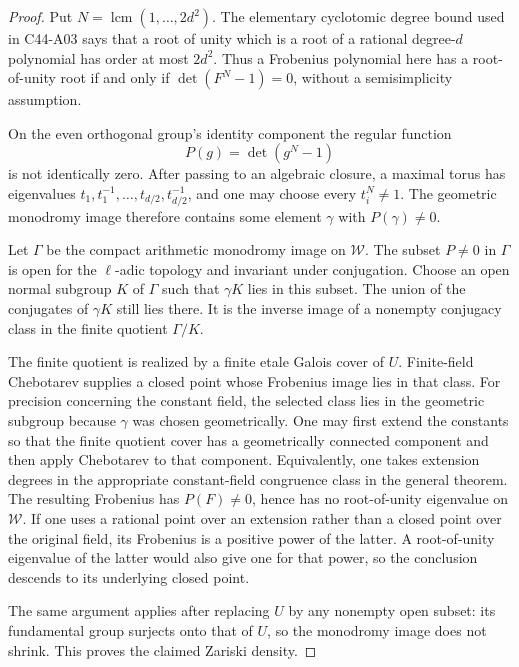 \documentclass[11pt]{article}
\theoremstyle{remark}\newtheorem{remark}[theorem]{Remark}
\begin{document}
\begin{proof}
Put \(N=\operatorname{lcm}(1,\ldots,2d^2)\).
The elementary cyclotomic degree bound used in C44-A03 says that a
root of unity which is a root of a rational degree-\(d\) polynomial
has order at most \(2d^2\). Thus a Frobenius polynomial here has a
root-of-unity root if and only if
\(\det(F^N-1)=0\), without a semisimplicity assumption.

On the even orthogonal group's identity component the regular function
\[
                     P(g)=\det(g^N-1)
\]
is not identically zero. After passing to an algebraic closure,
a maximal torus has eigenvalues
\(t_1,t_1^{-1},\ldots,t_{d/2},t_{d/2}^{-1}\), and one may choose
every \(t_i^N\ne1\).
The geometric monodromy image therefore contains some element
\(\gamma\) with \(P(\gamma)\ne0\).

Let \(\Gamma\) be the compact arithmetic monodromy image on
\(\mathcal W\). The subset \(P\ne0\) in \(\Gamma\) is open for
the \(\ell\)-adic topology and invariant under conjugation.
Choose an open normal subgroup \(K\) of \(\Gamma\) such that
\(\gamma K\) lies in this subset. The union of the conjugates of
\(\gamma K\) still lies there. It is the inverse image of a
nonempty conjugacy class in the finite quotient \(\Gamma/K\).

The finite quotient is realized by a finite etale Galois cover of
\(U\). Finite-field Chebotarev supplies a closed point whose
Frobenius image lies in that class. For precision concerning the
constant field, the selected class lies in the geometric subgroup
because \(\gamma\) was chosen geometrically. One may first extend
the constants so that the finite quotient cover has a geometrically
connected component and then apply Chebotarev to that component.
Equivalently, one takes extension degrees in the appropriate
constant-field congruence class in the general theorem.
The resulting Frobenius has \(P(F)\ne0\), hence has no
root-of-unity eigenvalue on \(\mathcal W\).
If one uses a rational point over an extension rather than a closed
point over the original field, its Frobenius is a positive power of
the latter. A root-of-unity eigenvalue of the latter would also
give one for that power, so the conclusion descends to its
underlying closed point.

The same argument applies after replacing \(U\) by any nonempty
open subset: its fundamental group surjects onto that of \(U\),
so the monodromy image does not shrink. This proves the claimed
Zariski density.


\end{proof}
\end{document}
